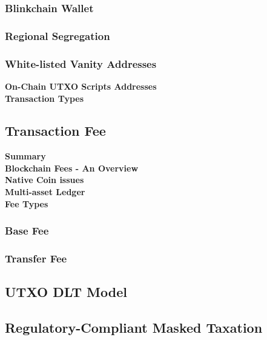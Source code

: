 \documentclass[letterpaper,11pt]{article}
\begin{document}
\subsubsection{Blinkchain Wallet}



\subsubsection{Regional Segregation}

\subsubsection{White-listed Vanity Addresses}

\textbf{On-Chain UTXO Scripts Addresses}\\

\textbf{Transaction Types}\\

\subsection{Transaction Fee}

\textbf{Summary}\\

\textbf{Blockchain Fees - An Overview}\\

\textbf{Native Coin issues}\\

\textbf{Multi-asset Ledger}\\

\textbf{Fee Types}\\

\subsubsection{Base Fee}

\subsubsection{Transfer Fee}
	
\subsection{UTXO DLT Model}



\subsection{Regulatory-Compliant Masked Taxation}
\end{document}
